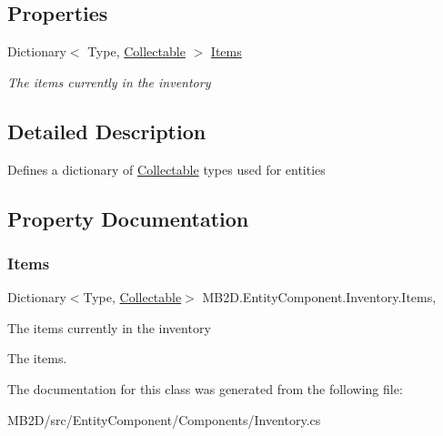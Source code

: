 \subsection*{Properties}
\begin{DoxyCompactItemize}
\item 
Dictionary$<$ Type, \hyperlink{class_m_b2_d_1_1_collectable}{Collectable} $>$ \hyperlink{class_m_b2_d_1_1_entity_component_1_1_inventory_a92e46a1ff1ec2caf6f01d7fca18e7232}{Items}
\begin{DoxyCompactList}\small\item\em The items currently in the inventory \end{DoxyCompactList}\end{DoxyCompactItemize}


\subsection{Detailed Description}
Defines a dictionary of \hyperlink{class_m_b2_d_1_1_collectable}{Collectable} types used for entities 



\subsection{Property Documentation}
\hypertarget{class_m_b2_d_1_1_entity_component_1_1_inventory_a92e46a1ff1ec2caf6f01d7fca18e7232}{}\label{class_m_b2_d_1_1_entity_component_1_1_inventory_a92e46a1ff1ec2caf6f01d7fca18e7232} 
\subsubsection{\texorpdfstring{Items}{Items}}
{\footnotesize\ttfamily Dictionary$<$Type, \hyperlink{class_m_b2_d_1_1_collectable}{Collectable}$>$ M\+B2\+D.\+Entity\+Component.\+Inventory.\+Items\hspace{0.3cm}{\ttfamily [get]}, {\ttfamily [set]}}



The items currently in the inventory 

The items.

The documentation for this class was generated from the following file\+:\begin{DoxyCompactItemize}
\item 
M\+B2\+D/src/\+Entity\+Component/\+Components/Inventory.\+cs\end{DoxyCompactItemize}
